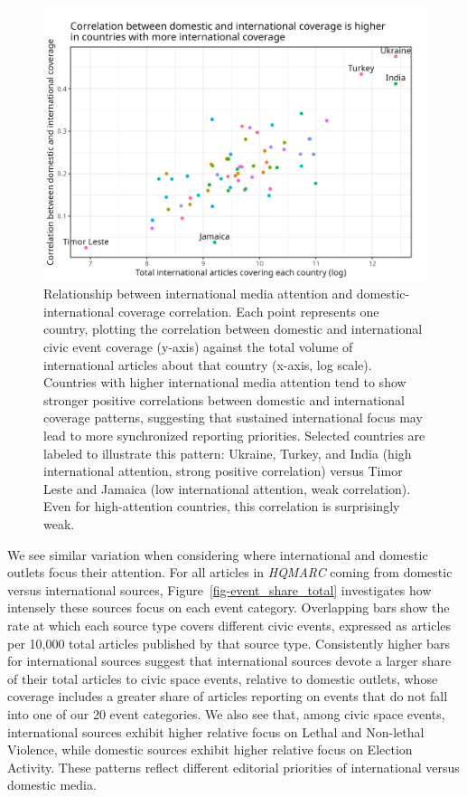 \documentclass[
  letterpaper,
  DIV=11,
  numbers=noendperiod]{scrartcl}
\begin{document}
\begin{figure}

{\centering \includegraphics{source_comparison/figures/int_nat_corr_by_country.png}

}

\caption{\label{fig-int_nat_corr_by_country}Relationship between
international media attention and domestic-international coverage
correlation. Each point represents one country, plotting the correlation
between domestic and international civic event coverage (y-axis) against
the total volume of international articles about that country (x-axis,
log scale). Countries with higher international media attention tend to
show stronger positive correlations between domestic and international
coverage patterns, suggesting that sustained international focus may
lead to more synchronized reporting priorities. Selected countries are
labeled to illustrate this pattern: Ukraine, Turkey, and India (high
international attention, strong positive correlation) versus Timor Leste
and Jamaica (low international attention, weak correlation). Even for
high-attention countries, this correlation is surprisingly weak.}

\end{figure}

We see similar variation when considering where international and
domestic outlets focus their attention. For all articles in
\emph{HQMARC} coming from domestic versus international sources,
Figure~\ref{fig-event_share_total} investigates how intensely these
sources focus on each event category. Overlapping bars show the rate at
which each source type covers different civic events, expressed as
articles per 10,000 total articles published by that source type.
Consistently higher bars for international sources suggest that
international sources devote a larger share of their total articles to
civic space events, relative to domestic outlets, whose coverage
includes a greater share of articles reporting on events that do not
fall into one of our 20 event categories. We also see that, among civic
space events, international sources exhibit higher relative focus on
Lethal and Non-lethal Violence, while domestic sources exhibit higher
relative focus on Election Activity. These patterns reflect different
editorial priorities of international versus domestic media.
\end{document}
